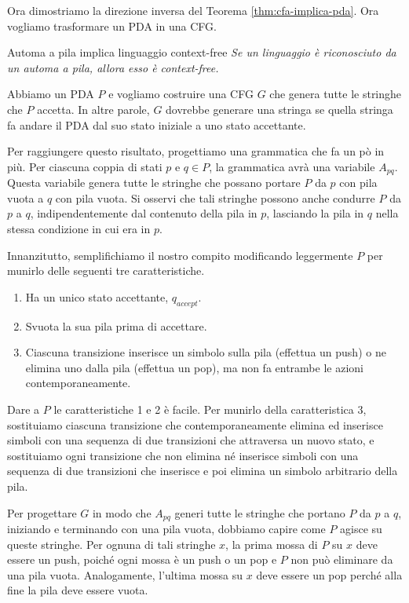 Ora dimostriamo la direzione inversa del Teorema \ref{thm:cfa-implica-pda}. Ora vogliamo trasformare un PDA in una CFG.

\begin{Lemma}{Automa a pila implica linguaggio context-free}{}
\textit{Se un linguaggio è riconosciuto da un automa a pila, allora esso è context-free.}

\begin{osservation}
Abbiamo un PDA $P$ e vogliamo costruire una CFG $G$ che genera tutte le stringhe che $P$ accetta. In altre parole, $G$ dovrebbe generare una stringa se quella stringa fa andare il PDA dal suo stato iniziale a uno stato accettante.

Per raggiungere questo risultato, progettiamo una grammatica che fa un pò in più. Per ciascuna coppia di stati $p$ e $q\in P$, la grammatica avrà una variabile $A_{pq}$. Questa variabile genera tutte le stringhe che possano portare $P$ da $p$ con pila vuota a $q$ con pila vuota. Si osservi che tali stringhe possono anche condurre $P$ da $p$ a $q$, indipendentemente dal contenuto della pila in $p$, lasciando la pila in $q$ nella stessa condizione in cui era in $p$.

Innanzitutto, semplifichiamo il nostro compito modificando leggermente $P$ per munirlo delle seguenti tre caratteristiche.
\begin{enumerate}
    \item Ha un unico stato accettante, $q_{accept}$.
    \item Svuota la sua pila prima di accettare.
    \item Ciascuna transizione inserisce un simbolo sulla pila (effettua un push) o ne elimina uno dalla pila (effettua un pop), ma non fa entrambe le azioni contemporaneamente.
\end{enumerate}

Dare a $P$ le caratteristiche 1 e 2 è facile. Per munirlo della caratteristica 3, sostituiamo ciascuna transizione che contemporaneamente elimina ed inserisce simboli con una sequenza di due transizioni che attraversa un nuovo stato, e sostituiamo ogni transizione che non elimina né inserisce simboli con una sequenza di due transizioni che inserisce e poi elimina un simbolo arbitrario della pila.

Per progettare $G$ in modo che $A_{pq}$ generi tutte le stringhe che portano $P$ da $p$ a $q$, iniziando e terminando con una pila vuota, dobbiamo capire come $P$ agisce su queste stringhe. Per ognuna di tali stringhe $x$, la prima mossa di $P$ su $x$ deve essere un push, poiché ogni mossa è un push o un pop e $P$ non può eliminare da una pila vuota. Analogamente, l'ultima mossa su $x$ deve essere un pop perché alla fine la pila deve essere vuota.


\end{osservation}
\end{Lemma}
